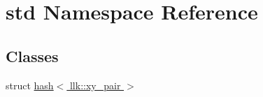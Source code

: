 \hypertarget{namespacestd}{}\section{std Namespace Reference}
\label{namespacestd}
\subsection*{Classes}
\begin{DoxyCompactItemize}
\item 
struct \hyperlink{structstd_1_1hash_3_01llk_1_1xy__pair_01_4}{hash$<$ llk\+::xy\+\_\+pair $>$}
\end{DoxyCompactItemize}
